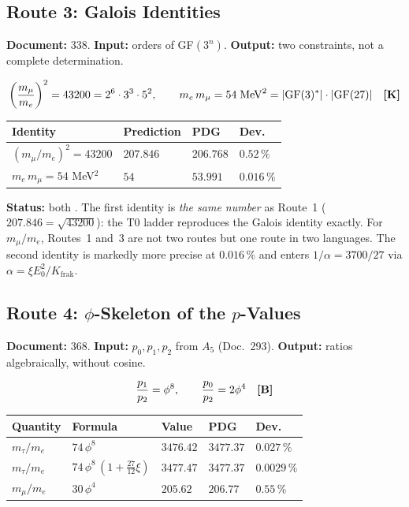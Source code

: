 \subsection{Route 3: Galois Identities}

\textbf{Document:} 338. \quad
\textbf{Input:} orders of GF$(3^n)$. \quad
\textbf{Output:} two constraints, not a complete determination.

\[
  \left(\frac{m_\mu}{m_e}\right)^2 = 43200 = 2^6\cdot3^3\cdot5^2, \qquad
  m_e\,m_\mu = 54\;\text{MeV}^2 = |\text{GF}(3)^*|\cdot|\text{GF}(27)| \quad \textbf{[K]}
\]

\begin{center}
\begin{tabular}{@{}llll@{}}
\toprule
Identity & Prediction & PDG & Dev. \\
\midrule
$(m_\mu/m_e)^2 = 43200$ & $207{.}846$ & $206{.}768$ & $0{.}52\,\%$ \\
$m_e\,m_\mu = 54$ MeV$^2$ & $54$ & $53{.}991$ & $0{.}016\,\%$ \\
\bottomrule
\end{tabular}
\end{center}

\textbf{Status:} both \KM. The first identity is \emph{the same number} as
Route~1 ($207{.}846 = \sqrt{43200}$): the T0 ladder reproduces the Galois identity
exactly. For $m_\mu/m_e$, Routes~1 and~3 are not two routes but one route in two
languages. The second identity is markedly more precise at $0{.}016\,\%$ and enters
$1/\alpha = 3700/27$ via $\alpha = \xi E_0^2/K_\text{frak}$.

\subsection{Route 4: $\phi$-Skeleton of the $p$-Values}

\textbf{Document:} 368. \quad
\textbf{Input:} $p_0,p_1,p_2$ from $A_5$ (Doc.~293). \quad
\textbf{Output:} ratios algebraically, without cosine.

\[
  \frac{p_1}{p_2} = \phi^8, \qquad \frac{p_0}{p_2} = 2\phi^4 \quad \textbf{[B]}
\]

\begin{center}
\begin{tabular}{@{}lllll@{}}
\toprule
Quantity & Formula & Value & PDG & Dev. \\
\midrule
$m_\tau/m_e$ & $74\,\phi^8$ & $3476{.}42$ & $3477{.}37$ & $0{.}027\,\%$ \\
$m_\tau/m_e$ & $74\,\phi^8\,(1+\tfrac{27}{12}\xi)$ & $3477{.}47$ & $3477{.}37$ & $0{.}0029\,\%$ \\
$m_\mu/m_e$  & $30\,\phi^4$ & $205{.}62$ & $206{.}77$ & $0{.}55\,\%$ \\
\bottomrule
\end{tabular}
\end{center}

